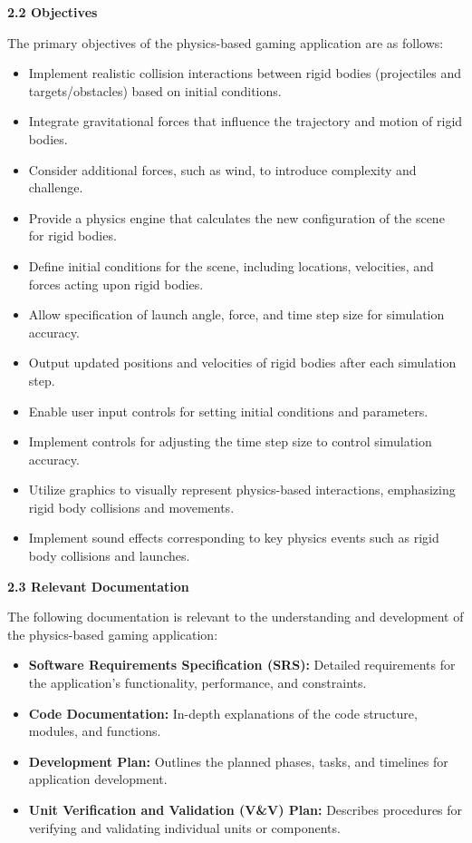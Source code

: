 \documentclass[
]{article}
\begin{document}
\textbf{2.2 Objectives}

The primary objectives of the physics-based gaming application are as
follows:

\begin{itemize}
\item
  Implement realistic collision interactions between rigid bodies
  (projectiles and targets/obstacles) based on initial conditions.
\item
  Integrate gravitational forces that influence the trajectory and
  motion of rigid bodies.
\item
  Consider additional forces, such as wind, to introduce complexity and
  challenge.
\item
  Provide a physics engine that calculates the new configuration of the
  scene for rigid bodies.
\item
  Define initial conditions for the scene, including locations,
  velocities, and forces acting upon rigid bodies.
\item
  Allow specification of launch angle, force, and time step size for
  simulation accuracy.
\item
  Output updated positions and velocities of rigid bodies after each
  simulation step.
\item
  Enable user input controls for setting initial conditions and
  parameters.
\item
  Implement controls for adjusting the time step size to control
  simulation accuracy.
\item
  Utilize graphics to visually represent physics-based interactions,
  emphasizing rigid body collisions and movements.
\item
  Implement sound effects corresponding to key physics events such as
  rigid body collisions and launches.
\end{itemize}

\textbf{2.3 Relevant Documentation}

The following documentation is relevant to the understanding and
development of the physics-based gaming application:

\begin{itemize}
\item
  \textbf{Software Requirements Specification (SRS):} Detailed
  requirements for the application's functionality, performance, and
  constraints.
\item
  \textbf{Code Documentation:} In-depth explanations of the code
  structure, modules, and functions.
\item
  \textbf{Development Plan:} Outlines the planned phases, tasks, and
  timelines for application development.
\item
  \textbf{Unit Verification and Validation (V\&V) Plan:} Describes
  procedures for verifying and validating individual units or
  components.
\end{itemize}
\end{document}
